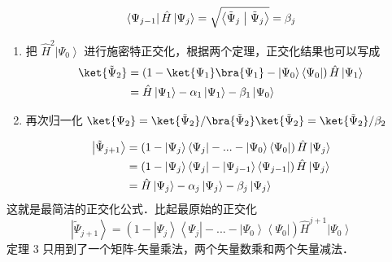 {\noindent {}}
\begin{equation}
\left\langle {{\Psi _{j - 1}}} \right|\hat H\left| {{\Psi _j}} \right\rangle  = \sqrt {\left\langle {{{{\tilde \Psi }_j}}}
 \mathrel{\left | {\vphantom {{{{\tilde \Psi }_j}} {{{\tilde \Psi }_j}}}}
 \right. \kern-\nulldelimiterspace}
 {{{{\tilde \Psi }_j}}} \right\rangle }  = {\beta _j}
\end{equation}

\begin{enumerate}[resume]
\item 把 ${\hat H^2}\left| {{\Psi _0}} \right\rangle$ 进行施密特正交化，根据两个定理，正交化结果也可以写成
\begin{equation}
\begin{aligned}
\ket{{{\tilde \Psi }_2}}  &= \left( {1 -\ket{{\Psi _1}}  \bra {{\Psi _1}}  - \left| {{\Psi _0}} \right\rangle \left\langle {{\Psi _0}} \right|} \right)\hat H\left| {{\Psi _1}} \right\rangle \\
   &= \hat H\left| {{\Psi _1}} \right\rangle  - {\alpha _1}\left| {{\Psi _1}} \right\rangle  - {\beta _1}\left| {{\Psi _0}} \right\rangle \\ 
\end{aligned}
\end{equation}
\item 再次归一化  $\ket{\Psi_2} = \ket{\tilde\Psi_2}/\bra{\tilde\Psi_2}\ket{\tilde\Psi_2} = \ket{\tilde\Psi_2}/\beta_2$
\end{enumerate}

{\noindent {}}
\begin{equation}\begin{aligned}
  \left| {{{\tilde \Psi }_{j + 1}}} \right\rangle  &= \left( {1 - \left| {{\Psi _j}} \right\rangle \left\langle {{\Psi _j}} \right| - ... - \left| {{\Psi _0}} \right\rangle \left\langle {{\Psi _0}} \right|} \right)\hat H\left| {{\Psi _j}} \right\rangle\\
&= \left( {1 - \left| {{\Psi _j}} \right\rangle \left\langle {{\Psi _j}} \right| - \left| {{\Psi _{j - 1}}} \right\rangle \left\langle {{\Psi _{j - 1}}} \right|} \right)\hat H\left| {{\Psi _j}} \right\rangle  \hfill \\
&= \hat H\left| {{\Psi _j}} \right\rangle  - {\alpha _j}\left| {{\Psi _j}} \right\rangle  - {\beta _j}\left| {{\Psi _j}} \right\rangle 
\end{aligned}\end{equation}
这就是最简洁的正交化公式．比起最原始的正交化
\begin{equation}
\left| {{{\tilde \Psi }_{j + 1}}} \right\rangle  = \left( {1 - \left| {{\Psi _j}} \right\rangle \left\langle {{\Psi _j}} \right| - ... - \left| {{\Psi _0}} \right\rangle \left\langle {{\Psi _0}} \right|} \right){\hat H^{j + 1}}\left| {{\Psi _0}} \right\rangle 
\end{equation}
定理 3 只用到了一个矩阵-矢量乘法，两个矢量数乘和两个矢量减法．

